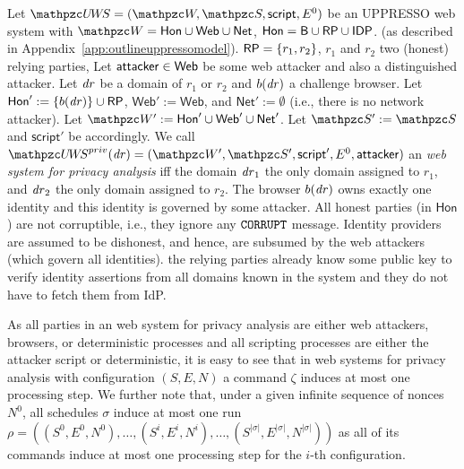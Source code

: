   \begin{definition}\label{def:uppresso-ws-priv}
    Let $\uppressowebsystem = (\bidsystem, \scriptset, 
    \mathsf{script}, E^0)$ be an UPPRESSO web system with 
    $\bidsystem = \mathsf{Hon} \cup \mathsf{Web} \cup \mathsf{Net}$, 
    $\mathsf{Hon} = \mathsf{B} \cup \mathsf{RP} \cup \mathsf{IDP}$.
    (as described in Appendix~\ref{app:outlineuppressomodel}).
    $\mathsf{RP} = \{r_1,r_2\}$, $r_1$ and $r_2$ two (honest) relying parties,
    Let $\mathsf{attacker} \in \mathsf{Web}$ be some web attacker and also a distinguished attacker.
    Let $\mathit{dr}$ be a domain of $r_1$ or $r_2$ and $b(\mathit{dr})$ a challenge browser. 
    Let $\mathsf{Hon}' := \{ b(\mathit{dr}) \} \cup \mathsf{RP}$, 
    $\mathsf{Web}' := \mathsf{Web}$, 
    and $\mathsf{Net}' := \emptyset$ (i.e., there is no network attacker).
    Let $\bidsystem' := \mathsf{Hon}' \cup \mathsf{Web}' \cup \mathsf{Net}'$.  
    Let $\scriptset' := \scriptset$ and $\mathsf{script}'$ be accordingly.
    We call $\uppressoprivwebsystem(\mi{dr}) = (\bidsystem', \scriptset', \mathsf{script}', E^0, \fAP{attacker})$ 
    an \emph{\uppresso web system for privacy analysis} 
    iff the domain $\mathit{dr}_1$ the only domain assigned to $r_1$, and
    $\mathit{dr}_2$ the only domain assigned to $r_2$. The browser
    $b(\mathit{dr})$ owns exactly one identity and this identity
    is governed by some attacker.  All honest parties (in
    $\mathsf{Hon}$) are not corruptible, i.e., they ignore any
    $\mathtt{CORRUPT}$ message. Identity providers are assumed to be
    dishonest, and hence, are subsumed by the web attackers (which
    govern all identities). %
    the relying
    parties already know some public key to verify \uppresso identity
    assertions from all domains known in the system and they do not have to fetch them from IdP.
  \end{definition}
  
  As all parties in an \uppresso web system for privacy analysis are either web 
  attackers, browsers, or deterministic processes and all scripting processes are 
  either the attacker script or deterministic, it is easy to see that in \uppresso 
  web systems for privacy analysis with configuration $(S,E,N)$ a command $\zeta$ 
  induces at most one processing step. We further note that, under a given infinite 
  sequence of nonces $N^0$, all schedules $\sigma$ induce at most one run 
  $\rho = ((S^0,E^0,N^0),\dots,(S^i,E^i,N^i),\dots,(S^{|\sigma|},E^{|\sigma|},N^{|\sigma|}))$ 
  as all of its commands induce at most one processing step for the $i$-th configuration.
  
